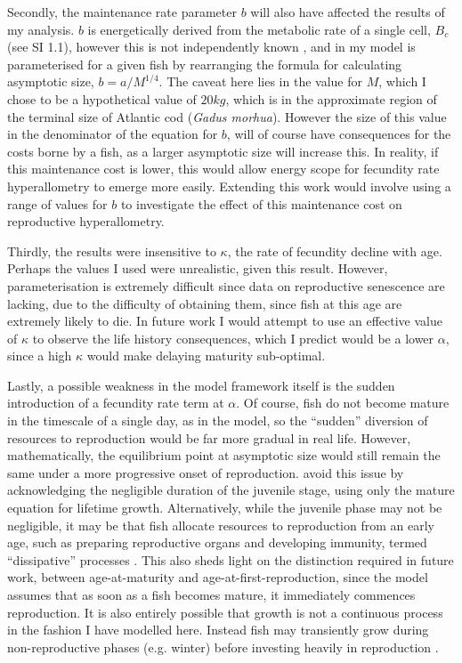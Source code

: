 \documentclass[a4paper]{article} %
\begin{document}
Secondly, the maintenance rate parameter $b$ will also have affected the results of my analysis. $b$ is energetically derived from the metabolic rate of a single cell, $B_c$ (see SI 1.1), however this is not independently known \autocite{West2001}, and in my model is parameterised for a given fish by rearranging the formula for calculating asymptotic size, $b = a/M^{1/4}$. The caveat here lies in the value for $M$, which I chose to be a hypothetical value of $20kg$, which is in the approximate region of the terminal size of Atlantic cod (\textit{Gadus morhua}). However the size of this value in the denominator of the equation for $b$, will of course have consequences for the costs borne by a fish, as a larger asymptotic size will increase this. In reality, if this maintenance cost is lower, this would allow energy scope for fecundity rate hyperallometry to emerge more easily. Extending this work would involve using a range of values for $b$ to investigate the effect of this maintenance cost on reproductive hyperallometry.

Thirdly, the results were insensitive to $\kappa$, the rate of fecundity decline with age. Perhaps the values I used were unrealistic, given this result. However, parameterisation is extremely difficult since data on reproductive senescence are lacking, due to the difficulty of obtaining them, since fish at this age are extremely likely to die. In future work I would attempt to use an effective value of $\kappa$ to observe the life history consequences, which I predict would be a lower $\alpha$, since a high $\kappa$ would make delaying maturity sub-optimal.

Lastly, a possible weakness in the model framework itself is the sudden introduction of a fecundity rate term at $\alpha$. Of course, fish do not become mature in the timescale of a single day, as in the model, so the ``sudden'' diversion of resources to reproduction would be far more gradual in real life. However, mathematically, the equilibrium point at asymptotic size would still remain the same under a more progressive onset of reproduction. \textcite{West2001} avoid this issue by acknowledging the negligible duration of the juvenile stage, using only the mature equation for lifetime growth. Alternatively, while the juvenile phase may not be negligible, it may be that fish allocate resources to reproduction from an early age, such as preparing reproductive organs and developing immunity, termed ``dissipative'' processes \autocite{kooijman2010dynamic, Kearney2012a, Marshall2019b}. This also sheds light on the distinction required in future work, between age-at-maturity and age-at-first-reproduction, since the model assumes that as soon as a fish becomes mature, it immediately commences reproduction. It is also entirely possible that growth is not a continuous process in the fashion I have modelled here. Instead fish may transiently grow during non-reproductive phases (e.g. winter) before investing heavily in reproduction \autocite{Kozowski1987-indeterminate}.
\end{document}

